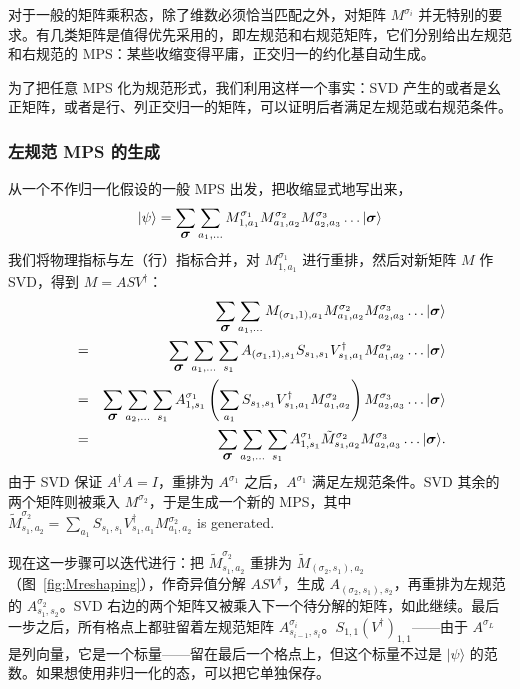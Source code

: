 \documentclass[a4paper,10pt,oneside,onecolumn,1p,times]{elsarticle}
\newcommand{\ket}[1]{\mbox{$| #1  \rangle$}}
\newcommand{\fat}[1]{\mbox{\boldmath$#1$\unboldmath}}	%
\begin{document}
对于一般的矩阵乘积态，除了维数必须恰当匹配之外，对矩阵 $M^{\sigma_i}$ 并无特别的要求。有几类矩阵是值得优先采用的，即左规范和右规范矩阵，它们分别给出左规范和右规范的 MPS：某些收缩变得平庸，正交归一的约化基自动生成。

为了把任意 MPS 化为规范形式，我们利用这样一个事实：SVD 产生的或者是幺正矩阵，或者是行、列正交归一的矩阵，可以证明后者满足左规范或右规范条件。

\subsubsection{左规范 MPS 的生成}
从一个不作归一化假设的一般 MPS 出发，把收缩显式地写出来，
\begin{equation}
\ket{\psi}= \sum_{\fat{\sigma}} \sum_{a_1,\ldots} M^{\sigma_ 1}_{1,a_1} M^{\sigma_2}_{a_1,a_2} M^{\sigma_3}_{a_2,a_3} \ldots \ket{\fat{\sigma}}
\end{equation}
我们将物理指标与左（行）指标合并，对 $M^{\sigma_ 1}_{1,a_1}$ 进行重排，然后对新矩阵 $M$ 作 SVD，得到 $M=ASV^\dagger$：
\begin{eqnarray}
& & \sum_{\fat{\sigma}} \sum_{a_1,\ldots} M_{(\sigma_ 1,1),a_1} M^{\sigma_2}_{a_1,a_2} M^{\sigma_3}_{a_2,a_3} \ldots \ket{\fat{\sigma}} \nonumber \\
&=&  \sum_{\fat{\sigma}} \sum_{a_1,\ldots} \sum_{s_1} A_{(\sigma_ 1,1),s_1} S_{s_1,s_1} V^\dagger_{s_1,a_1}  M^{\sigma_2}_{a_1,a_2}  \ldots \ket{\fat{\sigma}} \nonumber \\
&=& \sum_{\fat{\sigma}} \sum_{a_2,\ldots} \sum_{s_1} A^{\sigma_1}_{1,s_1} \left( \sum_{a_1} S_{s_1,s_1} V^\dagger_{s_1,a_1}  M^{\sigma_2}_{a_1,a_2} \right) M^{\sigma_3}_{a_2,a_3} \ldots \ket{\fat{\sigma}} \nonumber \\
&=& \sum_{\fat{\sigma}} \sum_{a_2,\ldots} \sum_{s_1} A^{\sigma_1}_{1,s_1} \tilde{M}^{\sigma_2}_{s_1,a_2} M^{\sigma_3}_{a_2,a_3} \ldots \ket{\fat{\sigma}} .
\end{eqnarray}
由于 SVD 保证 $A^\dagger A = I$，重排为 $A^{\sigma_1}$ 之后，$A^{\sigma_1}$ 满足左规范条件。SVD 其余的两个矩阵则被乘入 $M^{\sigma_2}$，于是生成一个新的 MPS，其中
$\tilde{M}^{\sigma_2}_{s_1,a_2} = \sum_{a_1} S_{s_1,s_1} V^\dagger_{s_1,a_1}  M^{\sigma_2}_{a_1,a_2}$ is generated. 

现在这一步骤可以迭代进行：把 $\tilde{M}^{\sigma_2}_{s_1,a_2}$ 重排为 $\tilde{M}_{(\sigma_2,s_1),a_2}$（图~\ref{fig:Mreshaping}），作奇异值分解 $ASV^\dagger$，生成 $A_{(\sigma_2,s_1),s_2}$，再重排为左规范的 $A^{\sigma_2}_{s_1,s_2}$。SVD 右边的两个矩阵又被乘入下一个待分解的矩阵，如此继续。最后一步之后，所有格点上都驻留着左规范矩阵 $A^{\sigma_i}_{s_{i-1},s_i}$。$S_{1,1} (V^\dagger)_{1,1}$——由于 $A^{\sigma_L}$ 是列向量，它是一个标量——留在最后一个格点上，但这个标量不过是 $\ket{\psi}$ 的范数。如果想使用非归一化的态，可以把它单独保存。
\end{document}
